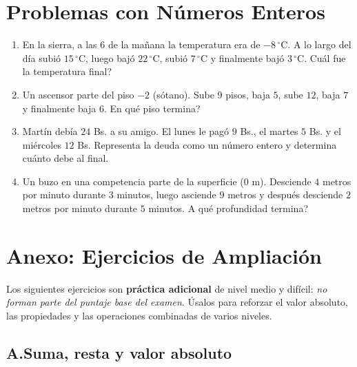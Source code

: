 \documentclass[12pt, letterpaper]{article}
\begin{document}
\newpage

\section{Problemas con Números Enteros}

\begin{enumerate}[leftmargin=*]
  \item En la sierra, a las 6 de la mañana la temperatura era de $-8\,^{\circ}$C. A lo largo del día subió $15\,^{\circ}$C, luego bajó $22\,^{\circ}$C, subió $7\,^{\circ}$C y finalmente bajó $3\,^{\circ}$C. \textquestiondown Cuál fue la temperatura final?

  \item Un ascensor parte del piso $-2$ (sótano). Sube $9$ pisos, baja $5$, sube $12$, baja $7$ y finalmente baja $6$. \textquestiondown En qué piso termina?

  \item Martín debía $24$ Bs. a su amigo. El lunes le pagó $9$ Bs., el martes $5$ Bs. y el miércoles $12$ Bs. Representa la deuda como un número entero y determina cuánto debe al final.

  \item Un buzo en una competencia parte de la superficie ($0$ m). Desciende $4$ metros por minuto durante $3$ minutos, luego asciende $9$ metros y después desciende $2$ metros por minuto durante $5$ minutos. \textquestiondown A qué profundidad termina?
\end{enumerate}

\newpage

\section{Anexo: Ejercicios de Ampliación}

\begin{cuadroinfo}
  \small
  Los siguientes ejercicios son \textbf{práctica adicional} de nivel medio y difícil: \emph{no forman parte del puntaje base del examen}. Úsalos para reforzar el valor absoluto, las propiedades y las operaciones combinadas de varios niveles.
\end{cuadroinfo}

\subsection*{A.\quad Suma, resta y valor absoluto}
\end{document}
